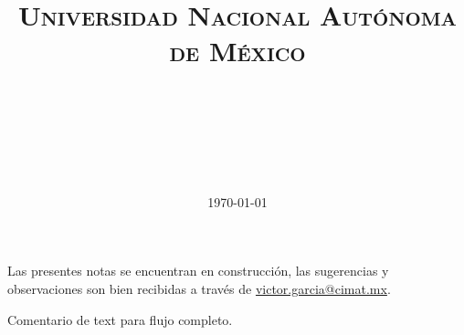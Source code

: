 \documentclass[paper=a4, fontsize=11pt]{scrartcl}
\title{
\normalfont\normalsize
\textsc{Universidad Nacional Autónoma de México} \\[25pt]
\horrule{0.5pt} \\[0.4cm]
\huge \titulo\\[25pt]
\horrule{2pt} \\[0.5cm]
}
\author{\autor}
\date{\normalsize\today}
\numberwithin{equation}{subsection}
\numberwithin{figure}{subsection}
\numberwithin{table}{subsection}
\theoremstyle{definition}
\begin{document}


Las presentes notas se encuentran en construcción, las sugerencias y observaciones son bien recibidas a través de \href{mailto:victor.garcia@cimat.mx}{victor.garcia@cimat.mx}.

Comentario de text para flujo completo.











%



\end{document}

